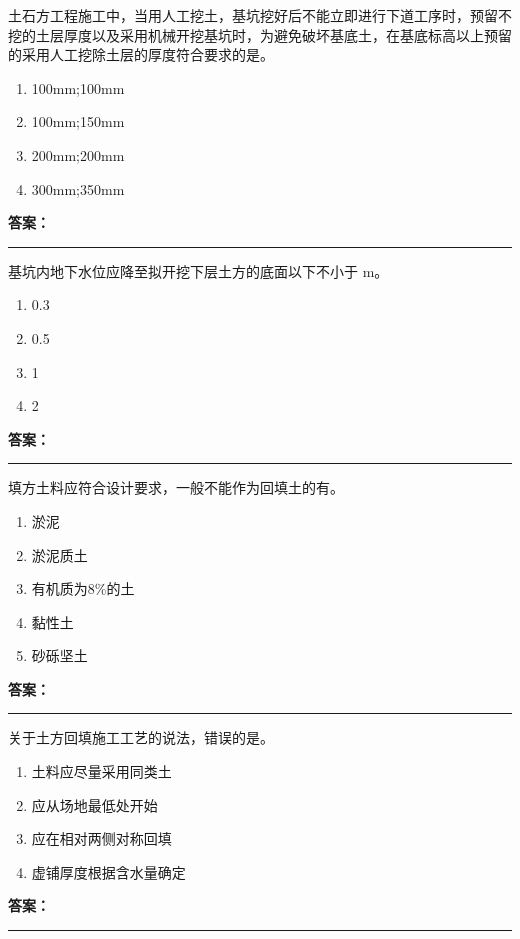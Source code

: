 \documentclass[UTF8,fontset=fandol,11pt]{ctexart}
\newcommand{\answerline}{\textcolor{answerred}{\rule{2.4cm}{0.7pt}}}
\begin{document}
\begin{quizbox}[title={第 15 题}]
土石方工程施工中，当用人工挖土，基坑挖好后不能立即进行下道工序时，预留不挖的土层厚度以及采用机械开挖基坑时，为避免破坏基底土，在基底标高以上预留的采用人工挖除土层的厚度符合要求的是。\\
\begin{enumerate}[label=\Alph*.]
\item 100mm;100mm
\item 100mm;150mm
\item 200mm;200mm
\item 300mm;350mm
\end{enumerate}
\textbf{\textcolor{answerred}{答案：}} \answerline
\end{quizbox}

\begin{quizbox}[title={第 16 题}]
基坑内地下水位应降至拟开挖下层土方的底面以下不小于 m。\\
\begin{enumerate}[label=\Alph*.]
\item 0.3
\item 0.5
\item 1
\item 2
\end{enumerate}
\textbf{\textcolor{answerred}{答案：}} \answerline
\end{quizbox}

\begin{quizbox}[title={第 17 题}]
填方土料应符合设计要求，一般不能作为回填土的有。\\
\begin{enumerate}[label=\Alph*.]
\item 淤泥
\item 淤泥质土
\item 有机质为8\%的土
\item 黏性土
\item 砂砾坚土
\end{enumerate}
\textbf{\textcolor{answerred}{答案：}} \answerline
\end{quizbox}

\begin{quizbox}[title={第 18 题}]
关于土方回填施工工艺的说法，错误的是。\\
\begin{enumerate}[label=\Alph*.]
\item 土料应尽量采用同类土
\item 应从场地最低处开始
\item 应在相对两侧对称回填
\item 虚铺厚度根据含水量确定
\end{enumerate}
\textbf{\textcolor{answerred}{答案：}} \answerline
\end{quizbox}
\end{document}
